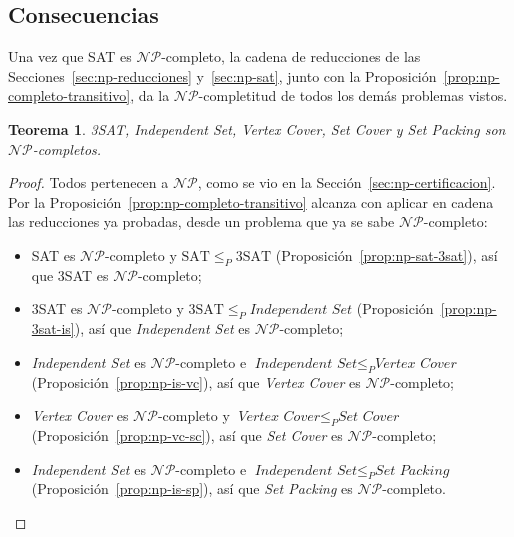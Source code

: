 \documentclass[12pt, spanish, oneside, openany]{book}
\newcommand{\NP}{\mathcal{NP}}
\newcommand{\redp}{\le_{P}}
\newcommand{\prob}[1]{\textit{#1}}
\newcommand{\IS}{\prob{Independent Set}\xspace}
\newcommand{\VC}{\prob{Vertex Cover}\xspace}
\newcommand{\SC}{\prob{Set Cover}\xspace}
\newcommand{\SP}{\prob{Set Packing}\xspace}
\theoremstyle{uprightplain}
\newtheorem{teorema}{Teorema}[section]
\theoremstyle{definition}
\theoremstyle{remark}
\theoremstyle{definition}
\begin{document}
\subsection{Consecuencias}
\label{subsec:np-consecuencias}

Una vez que SAT es $\NP$-completo, la cadena de reducciones de las Secciones~\ref{sec:np-reducciones} y~\ref{sec:np-sat}, junto con la Proposición~\ref{prop:np-completo-transitivo}, da la $\NP$-completitud de todos los demás problemas vistos.

\begin{teorema}
\label{teo:np-completos}
3SAT, \IS, \VC, \SC y \SP son $\NP$-completos.
\end{teorema}
\begin{proof}
Todos pertenecen a $\NP$, como se vio en la Sección~\ref{sec:np-certificacion}. Por la Proposición~\ref{prop:np-completo-transitivo} alcanza con aplicar en cadena las reducciones ya probadas, desde un problema que ya se sabe $\NP$-completo:
\begin{itemize}
    \item SAT es $\NP$-completo y $\mathrm{SAT}\redp 3\mathrm{SAT}$ (Proposición~\ref{prop:np-sat-3sat}), así que 3SAT es $\NP$-completo;
    \item 3SAT es $\NP$-completo y $3\mathrm{SAT}\redp\IS$ (Proposición~\ref{prop:np-3sat-is}), así que \IS es $\NP$-completo;
    \item \IS es $\NP$-completo e $\IS\redp\VC$ (Proposición~\ref{prop:np-is-vc}), así que \VC es $\NP$-completo;
    \item \VC es $\NP$-completo y $\VC\redp\SC$ (Proposición~\ref{prop:np-vc-sc}), así que \SC es $\NP$-completo;
    \item \IS es $\NP$-completo e $\IS\redp\SP$ (Proposición~\ref{prop:np-is-sp}), así que \SP es $\NP$-completo.\qedhere
\end{itemize}
\end{proof}
\end{document}
